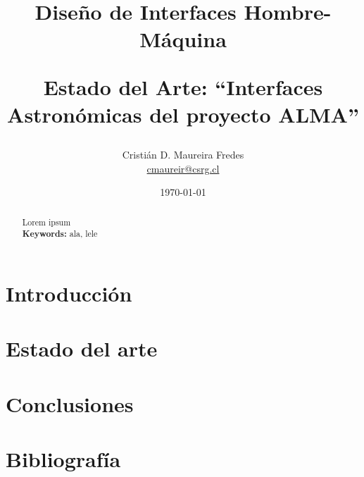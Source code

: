 \documentclass[letter, 10pt]{IEEEtran}
\begin{document}
%
\pagestyle{empty}

\title{Diseño de Interfaces Hombre-Máquina \\ \begin{Large}Estado del Arte: ``Interfaces Astronómicas del proyecto ALMA''\end{Large}}
\author{Cristián D. Maureira Fredes\\\url{cmaureir@csrg.cl}}
\date{\today}

\maketitle
\begin{abstract}
Lorem ipsum\\
{\bf Keywords: } ala, lele
\end{abstract}



\section{Introducción}
\label{sec:introduccion}


\section{Estado del arte}
\label{sec:estado_arte}


\section{Conclusiones}
\label{sec:conclusiones}


\section{Bibliografía}
%
\end{document}
